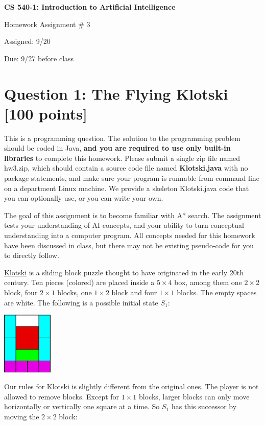 \documentclass[10pt,a4paper]{article}
\begin{document}
\begin{center}
{\bf \large CS 540-1: Introduction to Artificial Intelligence

Homework Assignment \# 3

\vspace{0.5cm}

Assigned:  9/20 

Due:  9/27 before class} 
\end{center}

\section*{Question 1: The Flying Klotski [100 points]}
This is a programming question. The solution to the programming problem should be coded in Java, {\bf and you are required to use only built-in libraries} to complete this homework. Please submit a single zip file named hw3.zip, which should contain a source code file named {\bf Klotski.java} with no package statements, and make sure your program is runnable from command line on a department Linux machine. 
We provide a skeleton Klotski.java code that you can optionally use, or you can write your own.

The goal of this assignment is to become familiar with A* search. The assignment tests your understanding of AI concepts, and your ability to turn conceptual understanding into a computer program. All concepts needed for this homework have been discussed in class, but there may not be existing pseudo-code for you to directly follow.

\href{https://en.wikipedia.org/wiki/Klotski}{Klotski} is a sliding block puzzle thought to have originated in the early 20th century. 
Ten pieces (colored) are placed inside a $5\times4$ box,
among them one $2\times2$ block, four $2\times1$ blocks, one $1\times2$ block and four $1\times1$ blocks. 
The empty spaces are white.
The following is a possible initial state $S_1$:

\centerline{\includegraphics[width=0.18\textwidth]{figure_1.eps}}

Our rules for Klotski is slightly different from the original ones. 
The player is not allowed to remove blocks. 
Except for $1\times1$ blocks, larger blocks can only move horizontally or vertically one square at a time. 
So $S_1$ has this successor by moving the $2\times 2$ block:
\end{document}

